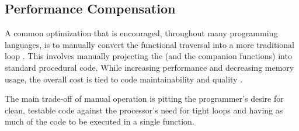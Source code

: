 \begin{minipage}{\linewidth}

\end{minipage} 

\subsection{Performance Compensation}
A common optimization that is encouraged, throughout many programming languages, is to manually convert the functional traversal into a more traditional  loop \cite{iterperf09} \cite{iterperf10} \cite{iterperf11}.  This involves manually projecting the \pipelineoperators (and the companion functions) into standard procedural code.  While increasing performance and decreasing memory usage, the overall cost is tied to code maintainability and quality \cite{langstudy14}.  

The main trade-off of manual operation is pitting the programmer's desire for clean, testable code against the processor's need for tight loops and having as much of the code to be executed in a single function.  